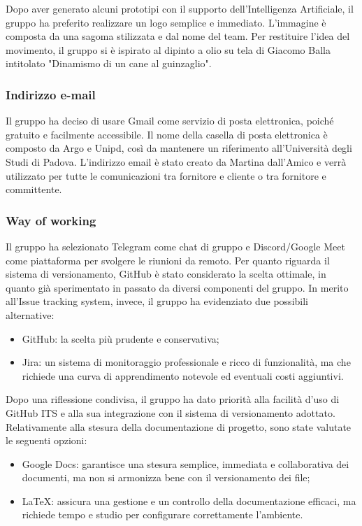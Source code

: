 Dopo aver generato alcuni prototipi con il supporto dell’Intelligenza Artificiale, il gruppo ha preferito realizzare un logo semplice e immediato. L’immagine è composta da una sagoma stilizzata e dal nome del team. Per restituire l’idea del movimento, il gruppo si è ispirato al dipinto a olio su tela di Giacomo Balla intitolato "Dinamismo di un cane al guinzaglio".

\subsubsection{Indirizzo e-mail}
Il gruppo ha deciso di usare Gmail come servizio di posta elettronica, poiché gratuito e facilmente accessibile. Il nome della casella di posta elettronica è composto da Argo e Unipd, così da mantenere un riferimento all’Università degli Studi di Padova. L’indirizzo email è stato creato da Martina dall’Amico e verrà utilizzato per tutte le comunicazioni tra fornitore e cliente o tra fornitore e committente.

\subsubsection{Way of working}
Il gruppo ha selezionato Telegram come chat di gruppo e Discord/Google Meet come piattaforma per svolgere le riunioni da remoto. Per quanto riguarda il sistema di versionamento, GitHub è stato considerato la scelta ottimale, in quanto già sperimentato in passato da diversi componenti del gruppo. In merito all’Issue tracking system, invece, il gruppo ha evidenziato due possibili alternative:
\begin{itemize}
	\item GitHub: la scelta più prudente e conservativa;
	\item Jira: un sistema di monitoraggio professionale e ricco di funzionalità, ma che richiede una curva di apprendimento notevole ed eventuali costi aggiuntivi.
\end{itemize}

Dopo una riflessione condivisa, il gruppo ha dato priorità alla facilità d'uso di GitHub ITS e alla sua integrazione con il sistema di versionamento adottato.
Relativamente alla stesura della documentazione di progetto, sono state valutate le seguenti opzioni:
\begin{itemize}
	\item Google Docs: garantisce una stesura semplice, immediata e collaborativa dei documenti, ma non si armonizza bene con il versionamento dei file;
	\item LaTeX: assicura una gestione e un controllo della documentazione efficaci, ma richiede tempo e studio per configurare correttamente l’ambiente.
\end{itemize}


